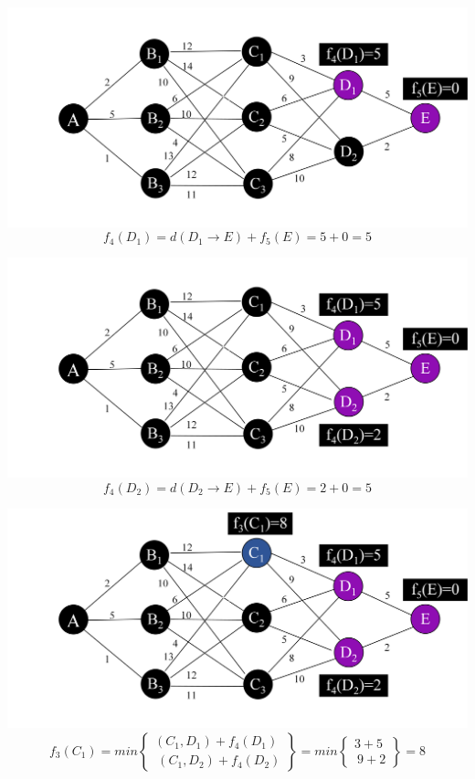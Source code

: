 \begin{frame}
    \includegraphics[width=\textwidth]{fig/dp1.png}
    $$f_4(D_1)=d(D_1\rightarrow E)+f_5(E)=5+0=5$$
\end{frame}
\begin{frame}
    \includegraphics[width=\textwidth]{fig/dp2.png}
    $$f_4(D_2)=d(D_2\rightarrow E)+f_5(E)=2+0=5$$
\end{frame}
\begin{frame}
    \includegraphics[width=\textwidth]{fig/dp3.png}
    $$f_3(C_1)=min \begin{Bmatrix}(C_1,D_1)+f_4(D_1)\\\ (C_1,D_2)+f_4(D_2) \end{Bmatrix} =min \begin{Bmatrix}3+5\\\ 9+2 \end{Bmatrix} =8$$
\end{frame}
